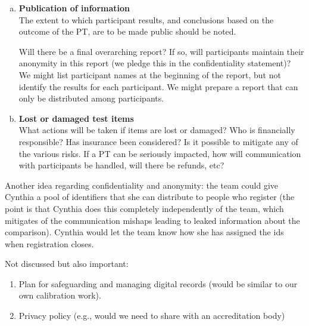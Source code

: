 \begin{enumerate}[a)]
\item	\textbf{Publication of information} \\
The extent to which participant results, and conclusions based on the outcome of the PT, are to be made public should be noted. 

Will there be a final overarching report? If so, will participants maintain their anonymity in this report (we pledge this in the confidentiality statement)? We might list participant names at the beginning of the report, but not identify the results for each participant. We might prepare a report that can only be distributed among participants.

\item	\textbf{Lost or damaged test items} \\
What actions will be taken if items are lost or damaged? Who is financially responsible? Has insurance been considered? Is it possible to mitigate any of the various risks. If a PT can be seriously impacted, how will communication with participants be handled, will there be refunds, etc?

\end{enumerate}

Another idea regarding confidentiality and anonymity: the team could give Cynthia a pool of identifiers that she can distribute to people who register (the point is that Cynthia does this completely independently of the team, which mitigates of the communication mishaps leading to leaked information about the comparison). Cynthia would let the team know how she has assigned the ids when registration closes.
 

Not discussed but also important: 
\begin{enumerate}
\item	Plan for safeguarding and managing digital records (would be similar to our own calibration work).
\item	Privacy policy (e.g., would we need to share with an accreditation body)
\end{enumerate}